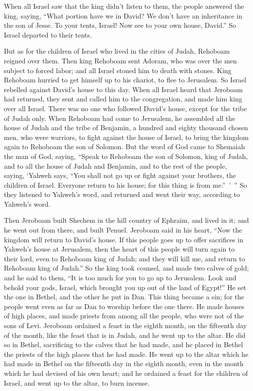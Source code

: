 {When all Israel saw that the king didn’t listen to them, the people answered the king, saying, “What portion have we in David? We don’t have an inheritance in the son of Jesse. To your tents, Israel! Now see to your own house, David.” So Israel departed to their tents.
\par }{\PP {}But as for the children of Israel who lived in the cities of Judah, Rehoboam reigned over them.
Then king Rehoboam sent Adoram, who was over the men subject to forced labor; and all Israel stoned him to death with stones. King Rehoboam hurried to get himself up to his chariot, to flee to Jerusalem.
So Israel rebelled against David’s house to this day.
When all Israel heard that Jeroboam had returned, they sent and called him to the congregation, and made him king over all Israel. There was no one who followed David’s house, except for the tribe of Judah only.
When Rehoboam had come to Jerusalem, he assembled all the house of Judah and the tribe of Benjamin, a hundred and eighty thousand chosen men, who were warriors, to fight against the house of Israel, to bring the kingdom again to Rehoboam the son of Solomon.
But the word of God came to Shemaiah the man of God, saying,
“Speak to Rehoboam the son of Solomon, king of Judah, and to all the house of Judah and Benjamin, and to the rest of the people, saying,
‘Yahweh says, “You shall not go up or fight against your brothers, the children of Israel. Everyone return to his house; for this thing is from me.” ’ ” So they listened to Yahweh’s word, and returned and went their way, according to Yahweh’s word.
\par }{\PP {}Then Jeroboam built Shechem in the hill country of Ephraim, and lived in it; and he went out from there, and built Penuel.
Jeroboam said in his heart, “Now the kingdom will return to David’s house.
If this people goes up to offer sacrifices in Yahweh’s house at Jerusalem, then the heart of this people will turn again to their lord, even to Rehoboam king of Judah; and they will kill me, and return to Rehoboam king of Judah.”
So the king took counsel, and made two calves of gold; and he said to them, “It is too much for you to go up to Jerusalem. Look and behold your gods, Israel, which brought you up out of the land of Egypt!”
He set the one in Bethel, and the other he put in Dan.
This thing became a sin; for the people went even as far as Dan to worship before the one there.
He made houses of high places, and made priests from among all the people, who were not of the sons of Levi.
Jeroboam ordained a feast in the eighth month, on the fifteenth day of the month, like the feast that is in Judah, and he went up to the altar. He did so in Bethel, sacrificing to the calves that he had made, and he placed in Bethel the priests of the high places that he had made.
He went up to the altar which he had made in Bethel on the fifteenth day in the eighth month, even in the month which he had devised of his own heart; and he ordained a feast for the children of Israel, and went up to the altar, to burn incense.

}
